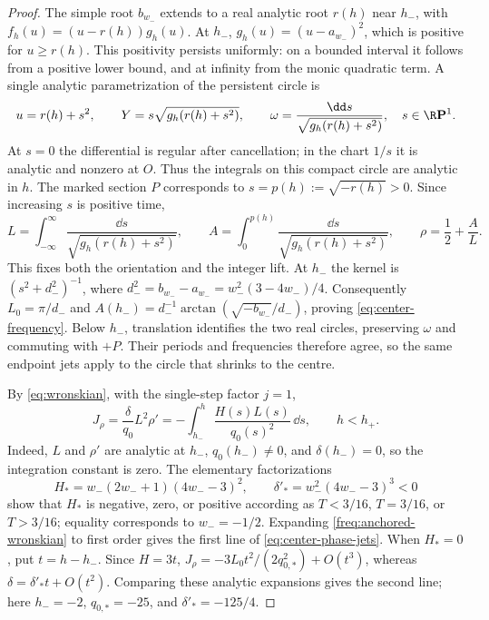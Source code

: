\begin{proof}
The simple root $b_{w_-}$ extends to a real analytic root $r(h)$ near
$h_-$, with $f_h(u)=(u-r(h))g_h(u)$.  At $h_-$,
$g_h(u)=(u-a_{w_-})^2$, which is positive for $u\ge r(h)$.
This positivity persists uniformly: on a bounded interval it follows
from a positive lower bound, and at infinity from the monic quadratic
term.  A single analytic parametrization of the persistent circle is
\begin{equation}\label{freq:persistent-parametrization}
 u=r(h)+s^2,\qquad Y=s\sqrt{g_h(r(h)+s^2)},\qquad
 \omega=\frac{\dd s}{\sqrt{g_h(r(h)+s^2)}},
 \quad s\in\R\mathbf P^1.
\end{equation}
At $s=0$ the differential is regular after cancellation; in the chart
$1/s$ it is analytic and nonzero at $O$.  Thus the integrals on this
compact circle are analytic in $h$.  The marked section $P$ corresponds
to $s=p(h):=\sqrt{-r(h)}>0$.  Since increasing $s$ is positive time,
\begin{equation}\label{freq:one-step-integrals}
 L=\int_{-\infty}^{\infty}\frac{\dd s}{\sqrt{g_h(r(h)+s^2)}},\qquad
 A=\int_0^{p(h)}\frac{\dd s}{\sqrt{g_h(r(h)+s^2)}},\qquad
 \rho=\frac12+\frac{A}{L}.
\end{equation}
This fixes both the orientation and the integer lift.  At $h_-$ the
kernel is $(s^2+d_-^2)^{-1}$, where
$d_-^2=b_{w_-}-a_{w_-}=w_-^2(3-4w_-)/4$.
Consequently $L_0=\pi/d_-$ and
$A(h_-)=d_-^{-1}\arctan(\sqrt{-b_{w_-}}/d_-)$, proving
\eqref{eq:center-frequency}.  Below $h_-$, translation identifies the
two real circles, preserving $\omega$ and commuting with $+P$.
Their periods and frequencies therefore agree, so the same endpoint
jets apply to the circle that shrinks to the centre.

By \eqref{eq:wronskian}, with the single-step factor $j=1$,
\begin{equation}\label{freq:anchored-wronskian}
 J_\rho=\frac{\delta}{q_0}L^2\rho'
 =-\int_{h_-}^{h}\frac{H(s)L(s)}{q_0(s)^2}\,\dd s,
 \qquad h<h_+.
\end{equation}
Indeed, $L$ and $\rho'$ are analytic at $h_-$, $q_0(h_-)\ne0$,
and $\delta(h_-)=0$, so the integration constant is zero.
The elementary factorizations
\begin{equation}\label{freq:anchor-signs}
 H_* =w_-(2w_-+1)(4w_--3)^2,\qquad
 \delta'_* =w_-^2(4w_--3)^3<0
\end{equation}
show that $H_*$ is negative, zero, or positive according as
$T<3/16$, $T=3/16$, or $T>3/16$; equality corresponds to
$w_-=-1/2$.  Expanding \eqref{freq:anchored-wronskian} to
first order gives the first line of \eqref{eq:center-phase-jets}.
When $H_*=0$, put $t=h-h_-$.  Since $H=3t$,
$J_\rho=-3L_0t^2/(2q_{0,*}^2)+O(t^3)$, whereas
$\delta=\delta'_*t+O(t^2)$.  Comparing these analytic expansions
gives the second line; here $h_-=-2$, $q_{0,*}=-25$, and
$\delta'_*=-125/4$.
\end{proof}

